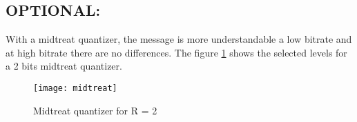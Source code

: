 \subsection{OPTIONAL:}
With a midtreat quantizer, the message is more understandable a low bitrate and at high bitrate there are no differences. The figure \ref{midtreat} shows the selected levels for a 2 bits midtreat quantizer.
\begin{figure}[h!]
  \centering
  \texttt{[image: midtreat]}
  \caption{Midtreat quantizer for R = 2}
  \label{midtreat}
\end{figure}

